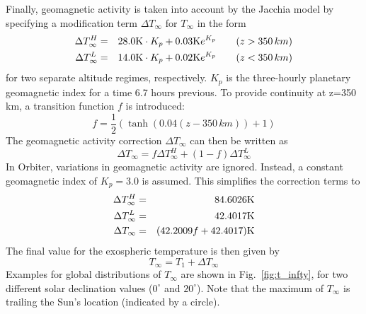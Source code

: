 \documentclass[Orbiter Technical Reference.tex]{subfiles}
\begin{document}
Finally, geomagnetic activity is taken into account by the Jacchia model by specifying a modification term $\Delta T_\infty$ for $T_\infty$ in the form
\begin{eqnarray}
\Delta T^H_\infty &=& 28.0\mathrm{K} \cdot K_p + 0.03\mathrm{K} e^{K_p}\qquad (z > 350\,km) \\
\Delta T^L_\infty &=& 14.0\mathrm{K} \cdot K_p + 0.02\mathrm{K} e^{K_p}\qquad (z < 350\,km)
\end{eqnarray}
for two separate altitude regimes, respectively. $K_p$ is the three-hourly planetary geomagnetic index for a time 6.7 hours previous. To provide continuity at z=350\,km, a transition function $f$ is introduced:
\begin{equation}
f = \frac{1}{2} (\tanh(0.04 (z - 350\,km)) + 1)
\end{equation}
The geomagnetic activity correction $\Delta T_\infty$ can then be written as
\begin{equation}
\Delta T_\infty = f \Delta T^H_\infty + (1-f) \Delta T^L_\infty
\end{equation}
In Orbiter, variations in geomagnetic activity are ignored. Instead, a constant geomagnetic index of $K_p = 3.0$ is assumed. This simplifies the correction terms to
\begin{eqnarray}
\Delta T^H_\infty &=& 84.6026\mathrm{K} \\
\Delta T^L_\infty &=& 42.4017\mathrm{K} \\
\Delta T_\infty &=& (42.2009 f + 42.4017)\mathrm{K}
\end{eqnarray}
The final value for the exospheric temperature is then given by
\begin{equation}
T_\infty = T_1 + \Delta T_\infty
\end{equation}
Examples for global distributions of $T_\infty$ are shown in Fig.~\ref{fig:t_infty}, for two different solar declination values ($0^\circ$ and $20^\circ$). Note that the maximum of $T_\infty$ is trailing the Sun's location (indicated by a circle).
\end{document}
